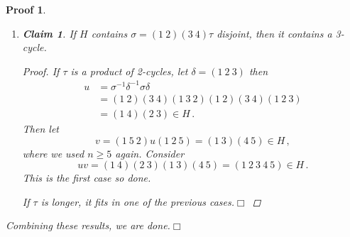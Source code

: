 \documentclass{article}
\theoremstyle{plain}\theoremheaderfont{\normalfont\itshape}\theorembodyfont{\rmfamily}\theoremseparator{.}\newtheorem*{rem}{Remark}\newtheorem*{ex}{Example}\newtheorem*{proof}{Proof}\newtheorem*{altp}{Alternative proof}\newtheorem*{nonex}{Non-Example}
\theoremstyle{plain}\theoremheaderfont{\normalfont\bfseries}\theorembodyfont{\rmfamily}\theoremseparator{.}\newtheorem{thm}{Theorem}[section]\newtheorem{lem}[thm]{Lemma}\newtheorem{prop}[thm]{Proposition}\newtheorem*{cor}{Corollary}\newtheorem{defn}[thm]{Definition}\newtheorem{clm}[thm]{Claim}\newtheorem{clminproof}{Claim}\newtheorem*{notn}{Notation}\newtheorem*{exer}{Exercise}\newtheorem*{lemnn}{Lemma}
\theoremstyle{break}\theoremheaderfont{\normalfont\itshape}\theorembodyfont{\rmfamily}\theoremseparator{.\medskip}\newtheorem*{proofskip}{Proof}\newtheorem*{exs}{Examples}\newtheorem*{rems}{Remarks}\newtheorem*{obs}{Observations}
\theoremstyle{break}\theoremheaderfont{\normalfont\bfseries}\theorembodyfont{\rmfamily}\theoremseparator{.\medskip}\newtheorem{lemskip}[thm]{Lemma}\newtheorem{defnskip}[thm]{Definition}\newtheorem{propskip}[thm]{Proposition}\newtheorem{thmskip}[thm]{Theorem}
\numberwithin{equation}{section}
\newcommand{\qed}{\hfill\ensuremath{\Box}}
\begin{document}
\begin{proofskip}
\begin{enumerate}[topsep=0pt,label=(\roman*),parsep=1em,rightmargin=20pt]
        \begin{proof}
                If \(\tau\) is a product of 2-cycles, then
                \[\sigma^2=(1 \ 2 \ 3)^2=(1 \ 3 \ 2)\]
                is a three cycle. If \(\tau\) is anything longer, then it falls into one of the previous cases.\qed
            \end{proof}
            \item \begin{clminproof}
                If \(H\) contains \(\sigma=(1 \ 2)(3 \ 4)\tau\) disjoint, then it contains a 3-cycle.
            \end{clminproof}
        \begin{proof}
                If \(\tau\) is a product of 2-cycles, let \(\delta=(1 \ 2 \ 3)\) then
                \begin{align*}
                    u&=\sigma^{-1}\delta^{-1}\sigma\delta\\
                    &=(1 \ 2)(3 \ 4)(1 \ 3 \ 2)(1 \ 2)(3 \ 4)(1 \ 2 \ 3)\\
                    &=(1 \ 4)(2 \ 3)\in H\,.
                \end{align*}
                Then let
                \[v=(1 \ 5 \ 2)u(1 \ 2 \ 5)=(1 \ 3)(4 \ 5)\in H\,,\]
                where we used \(n\ge 5\) again. Consider
                \[uv=(1 \ 4)(2 \ 3)(1 \ 3)(4 \ 5)=(1 \ 2 \ 3 \ 4 \ 5)\in H\,.\]
                This is the first case so done.

                If \(\tau\) is longer, it fits in one of the previous cases.\qed
            \end{proof}
        \end{enumerate}
        Combining these results, we are done.\qed
    \end{proofskip}
\end{document}
